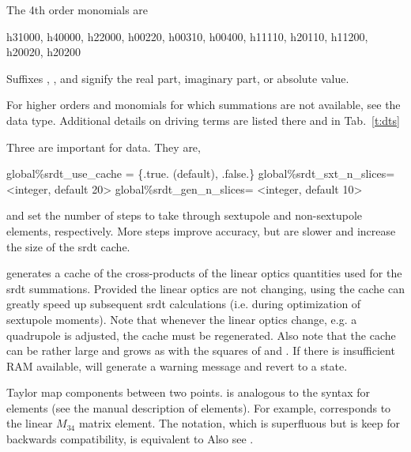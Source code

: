 \begin{description}
{{{{{{{{{The 4th order monomials are 
\begin{example}
  h31000, h40000, h22000,
  h00220, h00310, h00400, 
  h11110, h20110, h11200, h20020, h20200
\end{example}

Suffixes , , and  signify the real part, imaginary part, or absolute value.

For higher orders and monomials for which summations are not available, see the \Newline
{} data type.  Additional details on driving terms are listed there
and in Tab.~\ref{t:dts}

Three   are important for  data.  They are,
\begin{example}
  global{\%}srdt_use_cache = \{.true. (default), .false.\}
  global{\%}srdt_sxt_n_slices= <integer, default 20>
  global{\%}srdt_gen_n_slices= <integer, default 10>
\end{example}

 and  set the number of steps to take through sextupole
and non-sextupole elements, respectively.  More steps improve accuracy, but are slower and increase
the size of the srdt cache.

 generates a cache of the cross-products of the linear optics quantities used for
the srdt summations.  Provided the linear optics are not changing, using the cache can greatly speed
up subsequent srdt calculations (i.e. during optimization of sextupole moments).  Note that whenever
the linear optics change, e.g. a quadrupole is adjusted, the cache must be regenerated.  Also note
that the cache can be rather large and grows as with the squares of  and
.  If there is insufficient RAM available,  will generate a warning
message and revert to a  state.

  \item[t.$ijklm\ldots$,  tt.$ijklm\ldots$ \hspace{0.2in} $1 \le i,j,k,\ldots \le 6$] \Newline {}
Taylor map components between two points.  is analogous to the  syntax for
 elements (see the \bmad manual description of  elements). For example,
 corresponds to the linear $M_{34}$ matrix element. The  notation,
which is superfluous but is keep for backwards compatibility, is equivalent to 
Also see .

}}}}}}}}}
\end{description}
